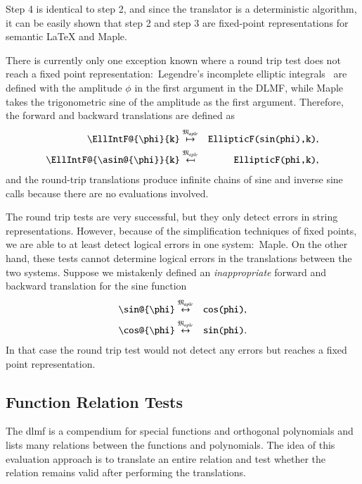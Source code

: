 \documentclass[a4paper,11pt]{article}
\newcommand{\DLMF}{DLMF}
\newcommand{\Maple}{Maple}
\newcommand{\langMaple}{\mathfrak{M}_{aple}}
\theoremstyle{defTheoStyle}
\theoremstyle{defExampStyle}
\begin{document}
	Step 4 is identical to step 2, and since the translator is a deterministic algorithm, it can be easily shown that step 2 and step 3 are fixed-point representations for semantic \LaTeX{} and \Maple.
	
	There is currently only one exception known where a round trip test does not reach a fixed point representation:~Legendre's incomplete elliptic integrals~\parencite[(19.2.4-7)]{NIST:DLMF} are defined with the amplitude $\phi$ in the first argument in the \DLMF, while \Maple{} takes the trigonometric sine of the amplitude as the first argument. Therefore, the forward and backward translations are defined as
	\begin{eqnarray}
	\verb|\EllIntF@{\phi}{k}| & \overset{\langMaple}{\mapsto} & \verb|EllipticF(sin(phi),k)|,\\
	\verb|\EllIntF@{\asin@{\phi}}{k}| & \overset{\langMaple}{\mapsfrom} & \verb|EllipticF(phi,k)|,
	\end{eqnarray}
	and the round-trip translations produce infinite chains of sine and inverse sine calls because there are no evaluations involved. 
	
	The round trip tests are very successful, but they only detect errors in string representations. However, because of the simplification techniques of fixed points, we are able to at least detect logical errors in one system:~\Maple. On the other hand, these tests cannot determine logical errors in the translations between the two systems. Suppose we mistakenly defined an \textit{inappropriate} forward and backward translation for the sine function
	\begin{eqnarray}
	\verb|\sin@{\phi}| & \overset{\langMaple}{\leftrightarrow} & \verb|cos(phi)|,\label{eq:wrong-trans-1}\\
	\verb|\cos@{\phi}| & \overset{\langMaple}{\leftrightarrow} & \verb|sin(phi)|.\label{eq:wrong-trans-2}
	\end{eqnarray}
	In that case the round trip test would not detect any errors but reaches a fixed point representation.
	
	\subsection{Function Relation Tests}\label{sec:relation-tests}
	The \gls*{dlmf} is a compendium for special functions and orthogonal polynomials and lists many relations between the functions and polynomials. The idea of this evaluation approach is to translate an entire relation and test whether the relation remains valid after performing the translations.
	
\end{document}

